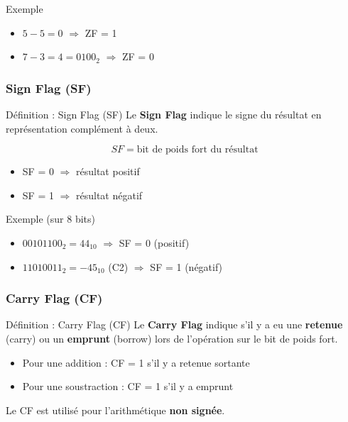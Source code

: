 \documentclass[a4paper,12pt]{article}
\begin{document}
\begin{examplebox}{Exemple}
\begin{itemize}
    \item $5 - 5 = 0$ $\Rightarrow$ ZF = 1
    \item $7 - 3 = 4 = 0100_2$ $\Rightarrow$ ZF = 0
\end{itemize}
\end{examplebox}

\subsubsection{Sign Flag (SF)}

\begin{defbox}{Définition : Sign Flag (SF)}
Le \textbf{Sign Flag} indique le signe du résultat en représentation complément à deux.

\[SF = \text{bit de poids fort du résultat}\]

\begin{itemize}
    \item SF = 0 $\Rightarrow$ résultat positif
    \item SF = 1 $\Rightarrow$ résultat négatif
\end{itemize}
\end{defbox}

\begin{examplebox}{Exemple (sur 8 bits)}
\begin{itemize}
    \item $00101100_2 = 44_{10}$ $\Rightarrow$ SF = 0 (positif)
    \item $11010011_2 = -45_{10}$ (C2) $\Rightarrow$ SF = 1 (négatif)
\end{itemize}
\end{examplebox}

\subsubsection{Carry Flag (CF)}

\begin{defbox}{Définition : Carry Flag (CF)}
Le \textbf{Carry Flag} indique s'il y a eu une \textbf{retenue} (carry) ou un \textbf{emprunt} (borrow) lors de l'opération sur le bit de poids fort.

\begin{itemize}
    \item Pour une addition : CF = 1 s'il y a retenue sortante
    \item Pour une soustraction : CF = 1 s'il y a emprunt
\end{itemize}

Le CF est utilisé pour l'arithmétique \textbf{non signée}.
\end{defbox}
\end{document}

